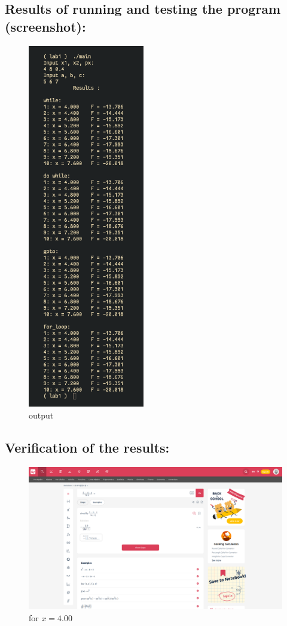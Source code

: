 \documentclass[a4paper, 11p]{article}
\begin{document}
\subsection{Results of running and testing the program (screenshot):}
\begin{figure}[!h]
  \centering
  \includegraphics[width=2in]{output.png}
  \caption{output}
\end{figure}
\pagebreak

\subsection{Verification of the results\cite{testlabs}:}
\begin{figure}[!h]
  \centering
  \includegraphics[width=6in]{verif_1.png}
  \caption{for \( x = 4.00 \)}
\end{figure}
\end{document}
